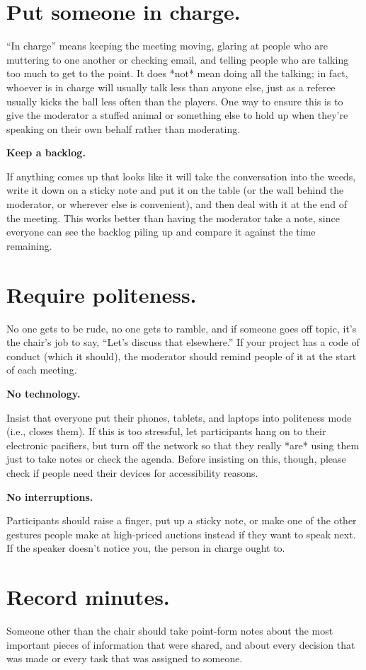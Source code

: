 \documentclass[10pt,letterpaper]{article}
\newcommand{\rulemajor}[1]{\section{#1}}
\begin{document}
\rulemajor{Put someone in charge.}

``In charge'' means keeping the meeting moving, glaring at people who are
muttering to one another or checking email, and telling people who are talking
too much to get to the point.  It does *not* mean doing all the talking; in
fact, whoever is in charge will usually talk less than anyone else, just as a
referee usually kicks the ball less often than the players.  One way to ensure
this is to give the moderator a stuffed animal or something else to hold up when
they're speaking on their own behalf rather than moderating.

\textbf{Keep a backlog.}

If anything comes up that looks like it will take the conversation into the
weeds, write it down on a sticky note and put it on the table (or the wall
behind the moderator, or wherever else is convenient), and then deal with it at
the end of the meeting.  This works better than having the moderator take a
note, since everyone can see the backlog piling up and compare it against the
time remaining.

\rulemajor{Require politeness.}

No one gets to be rude, no one gets to ramble, and if someone goes off topic,
it's the chair's job to say, ``Let's discuss that elsewhere.''  If your project
has a code of conduct (which it should), the moderator should remind people of
it at the start of each meeting.

\textbf{No technology.}

Insist that everyone put their phones, tablets, and laptops into politeness mode
(i.e., closes them).  If this is too stressful, let participants hang on to
their electronic pacifiers, but turn off the network so that they really *are*
using them just to take notes or check the agenda.  Before insisting on this,
though, please check if people need their devices for accessibility reasons.

\textbf{No interruptions.}

Participants should raise a finger, put up a sticky note, or make one of the
other gestures people make at high-priced auctions instead if they want to speak
next.  If the speaker doesn't notice you, the person in charge ought to.

\rulemajor{Record minutes.}

Someone other than the chair should take point-form notes about the most
important pieces of information that were shared, and about every decision that
was made or every task that was assigned to someone.
\end{document}
